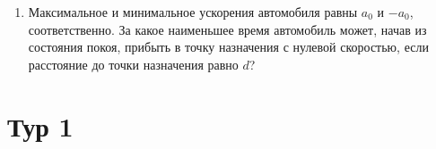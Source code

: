 \documentclass[12pt]{article} %
\begin{document}
\begin{enumerate}
\begin{minipage}{\linewidth}
\begin{minipage}{0.3\linewidth}
        \end{minipage}
    \end{minipage}



\item Максимальное и минимальное ускорения автомобиля равны $a_0$ и $-a_0$, соответственно. 
За какое наименьшее время автомобиль может, начав из состояния покоя, прибыть в точку назначения с нулевой скоростью, 
если расстояние до точки назначения равно $d$?

\end{enumerate}
    



\section*{Тур 1}
\end{document}
